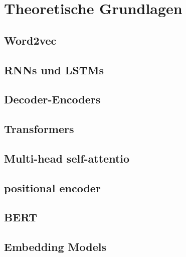 \chapter{Theoretische Grundlagen}
\section{Word2vec}
\section{RNNs und LSTMs}
\section{Decoder-Encoders}
\section{Transformers}
\section{Multi-head self-attentio}
\section{positional encoder}
\section{BERT}
\section{Embedding Models}
